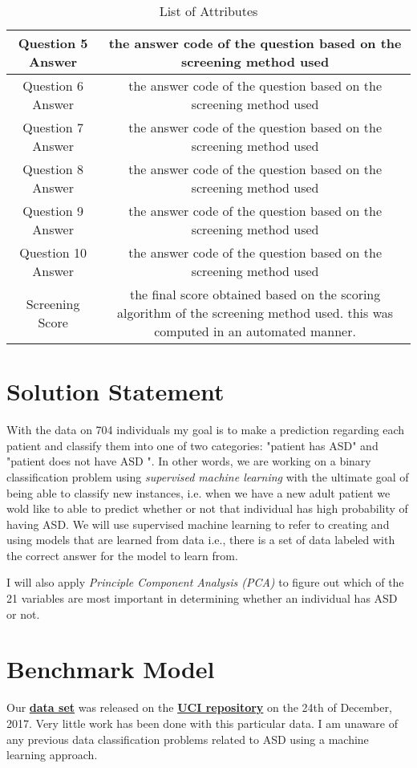 \documentclass[12pt, oneside]{article}
\theoremstyle{definition}
\begin{document}
\begin{center}
\begin{table}[h]
\begin{adjustbox}{width=1\textwidth}
\begin{tabular}{ |c|c|}
Question 5 Answer &  the answer code of the question based on the screening method used\\  \hline
Question 6 Answer &  the answer code of the question based on the screening method used\\  \hline
Question 7 Answer &  the answer code of the question based on the screening method used\\  \hline
Question 8 Answer & the answer code of the question based on the screening method used \\  \hline
Question 9 Answer & the answer code of the question based on the screening method used\\  \hline
Question 10 Answer &  the answer code of the question based on the screening method used\\ \hline
Screening Score &  the final score obtained based on the scoring algorithm of the screening method used. \newline this was computed in an automated manner.\\  \hline
\end{tabular}
\end{adjustbox}
\caption{List of Attributes\label{t2}}
\end{table}
\end{center}
\section{Solution Statement}
With the data on 704 individuals my goal is to make a prediction regarding each patient and classify them into one of two categories: "patient has ASD" and "patient does not have ASD ". In other words, we are working on a binary classification problem using {\it supervised machine learning} with the ultimate goal of being able to classify new instances, i.e. when we have a new adult patient we wold like to able to predict whether or not that individual has high probability of having ASD.  We will use supervised machine learning to refer to creating and using models that are learned from data i.e., there is a set of data labeled with the correct answer for the model to learn from. 

I will also apply {\it Principle Component Analysis (PCA)} to figure out which of the 21 variables are most important in determining whether an individual has ASD or not.
\section{Benchmark Model}
Our \href{https://archive.ics.uci.edu/ml/datasets/Autistic+Spectrum+Disorder+Screening+Data+for+Adolescent+++}{\textbf{data set}} was released on the \href{https://archive.ics.uci.edu/ml/index.php}{\textbf{UCI repository}} on the 24th of December, 2017. Very little work has been done with this particular data. 
I am unaware of any previous data classification problems related to ASD using a machine learning approach.
\end{document}
